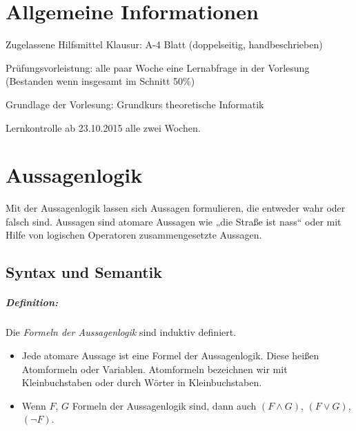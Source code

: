 






\maketitle
\newpage
\tableofcontents
\newpage

\chapter*{Allgemeine Informationen}

Zugelassene Hilfsmittel Klausur: A-4 Blatt (doppelseitig, handbeschrieben)

Prüfungsvorleistung: alle paar Woche eine Lernabfrage in der Vorlesung (Bestanden wenn insgesamt im Schnitt 50\%)

Grundlage der Vorlesung: Grundkurs theoretische Informatik \cite{hollas2007grundkurs}

Lernkontrolle ab 23.10.2015 alle zwei Wochen.

\chapter{Aussagenlogik}

Mit der Aussagenlogik lassen sich Aussagen formulieren, die entweder wahr oder falsch sind. Aussagen sind atomare Aussagen wie „die Straße ist nass“ oder mit Hilfe von logischen Operatoren zusammengesetzte Aussagen.

\section{Syntax und Semantik}

\paragraph{Definition:} Die \emph{Formeln der Aussagenlogik} sind induktiv definiert.

\begin{itemize}
\item Jede atomare Aussage ist eine Formel der Aussagenlogik. Diese heißen Atomformeln oder Variablen. 
Atomformeln bezeichnen wir mit Kleinbuchstaben oder durch Wörter in Kleinbuchstaben.
\item Wenn $F$, $G$ Formeln der Aussagenlogik sind, dann auch $(F \wedge G)$, $(F\vee G)$, $(\neg F)$.
\end{itemize}

